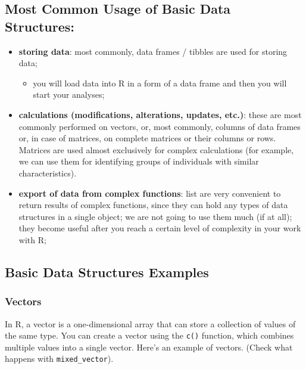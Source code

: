\documentclass[
]{book}
\providecommand{\tightlist}{%
  \setlength{\itemsep}{0pt}\setlength{\parskip}{0pt}}
\begin{document}
\hypertarget{most-common-usage-of-basic-data-structures}{%
\subsection{Most Common Usage of Basic Data Structures:}\label{most-common-usage-of-basic-data-structures}}

\begin{itemize}
\tightlist
\item
  \textbf{storing data}: most commonly, data frames / tibbles are used for storing data;

  \begin{itemize}
  \tightlist
  \item
    you will load data into R in a form of a data frame and then you will start your analyses;
  \end{itemize}
\item
  \textbf{calculations (modifications, alterations, updates, etc.)}: these are most commonly performed on vectors, or, most commonly, columns of data frames or, in case of matrices, on complete matrices or their columns or rows. Matrices are used almost exclusively for complex calculations (for example, we can use them for identifying groups of individuals with similar characteristics).
\item
  \textbf{export of data from complex functions}: list are very convenient to return results of complex functions, since they can hold any types of data structures in a single object; we are not going to use them much (if at all); they become useful after you reach a certain level of complexity in your work with R;
\end{itemize}

\hypertarget{basic-data-structures-examples}{%
\subsection{Basic Data Structures Examples}\label{basic-data-structures-examples}}

\hypertarget{vectors}{%
\subsubsection{Vectors}\label{vectors}}

In R, a vector is a one-dimensional array that can store a collection of values of the same type. You can create a vector using the \texttt{c()} function, which combines multiple values into a single vector. Here's an example of vectors. (Check what happens with \texttt{mixed\_vector}).
\end{document}
